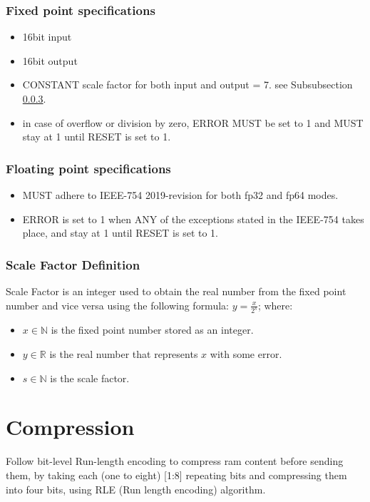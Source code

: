 \documentclass[12pt]{report}
\begin{document}
\subsubsection{Fixed point specifications}
\begin{itemize}
    \item 16bit input
    \item 16bit output
    \item CONSTANT scale factor for both input and output = 7. see Subsubsection \ref{sec:fpu:scale}.
    \item in case of overflow or division by zero, ERROR MUST be set to 1 and MUST stay at 1 until RESET is set to 1.
\end{itemize}

\subsubsection{Floating point specifications}
\begin{itemize}
    \item MUST adhere to IEEE-754 2019-revision \cite{ieee754} for both fp32 and fp64 modes.
    \item ERROR is set to 1 when ANY of the exceptions stated in the IEEE-754 takes place, and stay at 1 until RESET is set to 1.
\end{itemize}

\subsubsection{Scale Factor Definition}
\label{sec:fpu:scale}
Scale Factor is an integer used to obtain the real number from the fixed point number and vice versa using the following formula: 
$y = \frac{x}{2^s}$; where: 
\begin{itemize}
    \item $x \in \mathbb{N}$ is the fixed point number stored as an integer.
    \item $y \in \mathbb{R}$ is the real number that represents $x$ with some error.
    \item $s \in \mathbb{N}$ is the scale factor.
\end{itemize}

\section{Compression}
Follow bit-level Run-length encoding to compress ram content before sending them, by taking each (one to eight) [1:8] repeating bits and compressing them into four bits, using RLE (Run length encoding) algorithm.
\end{document}
